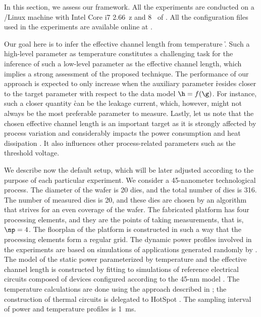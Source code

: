 In this section, we assess our framework. All the experiments are conducted on a
/Linux machine with Intel Core i7 2.66~z and 8~ of
. All the configuration files used in the experiments are available
online at \cite{eslab2013}.

Our goal here is to infer the effective channel length \g from temperature \h.
Such a high-level parameter as temperature constitutes a challenging task for
the inference of such a low-level parameter as the effective channel length,
which implies a strong assessment of the proposed technique. The performance of
our approach is expected to only increase when the auxiliary parameter \h
resides closer to the target parameter \g with respect to the data model $\h =
f(\g)$. For instance, such a closer quantity \h can be the leakage current,
which, however, might not always be the most preferable parameter to measure.
Lastly, let us note that the chosen effective channel length is an important
target as it is strongly affected by process variation and considerably impacts
the power consumption and heat dissipation \cite{chandrakasan2000,
srivastava2010, juan2011, juan2012}. It also influences other process-related
parameters such as the threshold voltage.

We describe now the default setup, which will be later adjusted according to the
purpose of each particular experiment. We consider a 45-nanometer technological
process. The diameter of the wafer is 20 dies, and the total number of dies \nd
is 316. The number of measured dies \hnd is 20, and these dies are chosen by an
algorithm that strives for an even coverage of the wafer. The fabricated
platform has four processing elements, and they are the points of taking
measurements, that is, $\np = 4$. The floorplan of the platform is constructed
in such a way that the processing elements form a regular grid. The dynamic
power profiles involved in the experiments are based on simulations of
applications generated randomly by  \cite{dick1998}. The model of the
static power parameterized by temperature and the effective channel length is
constructed by fitting to  simulations of reference electrical
circuits composed of  devices \cite{bsim} configured according to the
45-nm   model \cite{ptm}. The temperature calculations are done
using the approach described in ; the
construction of thermal  circuits is delegated to HotSpot
\cite{skadron2003}. The sampling interval of power and temperature profiles is
1~ms.

